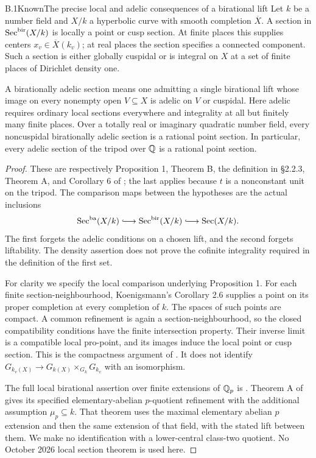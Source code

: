 \begin{statement}{B.1}{Known}{The precise local and adelic consequences of a birational lift}
Let $k$ be a number field and $X/k$ a hyperbolic curve with smooth
completion $\overline X$.  A section in $\operatorname{Sec}^{\mathrm{bir}}(X/k)$ is
locally a point or cusp section.  At finite places this supplies centers
$x_v\in\overline X(k_v)$; at real places the section specifies a connected
component.  Such a section is either globally cuspidal or is integral
on $X$ at a set of finite places of Dirichlet density one.

A birationally adelic section means one admitting a single birational
lift whose image on every nonempty open $V\subseteq X$ is adelic on $V$
or cuspidal.  Here adelic requires ordinary local sections everywhere
and integrality at all but finitely many finite places.  Over a totally
real or imaginary quadratic number field, every noncuspidal
birationally adelic section is a rational point section.  In particular,
every adelic section of the tripod over $\mathbb Q$ is a rational point section.
\end{statement}
\begin{proof}
These are respectively Proposition 1, Theorem B, the definition in
\S2.2.3, Theorem A, and Corollary 6 of
\cite{BIR_Stix2015}; the last applies because $t$ is a nonconstant
unit on the tripod.  The comparison maps between the hypotheses are
the actual inclusions
\[
 \Sec^{\mathrm{ba}}(X/k)\lhook\joinrel\longrightarrow
 \Sec^{\mathrm{bir}}(X/k)\lhook\joinrel\longrightarrow\Sec(X/k).
\]
The first forgets the adelic conditions on a chosen lift, and the second
forgets liftability.  The density assertion does not prove the cofinite
integrality required in the definition of the first set.

For clarity we specify the local comparison underlying Proposition 1.
For each finite section-neighbourhood, Koenigsmann's Corollary 2.6
supplies a point on its proper completion at every completion of $k$.
The spaces of such points are compact.  A common refinement is again
a section-neighbourhood, so the closed compatibility conditions have
the finite intersection property.  Their inverse limit is a compatible
local pro-point, and its images induce the local point or cusp section.
This is the compactness argument of \cite[Lemma 1.7]{BIR_Koenigsmann2005}.
It does not identify
$G_{k_v(X)}\to G_{k(X)}\times_{G_k}G_{k_v}$ with an isomorphism.

The full local birational assertion over finite extensions of $\mathbb Q_p$
is \cite[Proposition 2.4(2), Definition 1.4]{BIR_Koenigsmann2005}.
Theorem A of \cite{BIR_Pop2010} gives its specified elementary-abelian
$p$-quotient refinement with the additional assumption $\mu_p\subseteq k$.
That theorem uses the maximal elementary abelian $p$ extension and
then the same extension of that field, with the stated lift between
them.  We make no identification with a lower-central class-two
quotient.  No October 2026 local section theorem is used here.
\end{proof}

